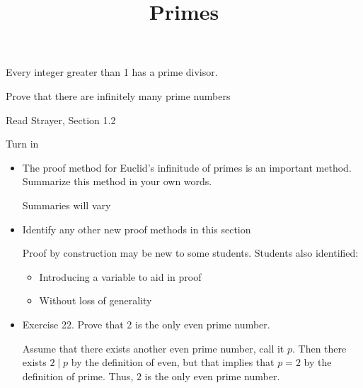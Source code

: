 \documentclass{ximera}
\title{Primes}
\begin{document}
\begin{abstract}
\end{abstract}
\maketitle


\begin{obj}
\item  Every integer greater than 1 has a prime divisor.
\item  Prove that there are infinitely many prime numbers
\end{obj}


\begin{instructorNotes}

\begin{pre}
 \item[Read] Strayer, Section 1.2
 \item[Turn in] 
\begin{itemize}
 \item The proof method for Euclid's infinitude of primes is an important method. Summarize this method in your own words.
 
\begin{solution}
 Summaries will vary
\end{solution}
 \item Identify any other new proof methods in this section
 
\begin{solution}
 Proof by construction may be new to some students. Students also identified: 
\begin{itemize}
 \item Introducing a variable to aid in proof
 \item Without loss of generality
 
\end{itemize}
\end{solution}
 \item Exercise 22. Prove that 2 is the only even prime number.
 
\begin{solution}
 Assume that there exists another even prime number, call it $p$. Then there exists $2\mid p$ by the definition of even, but that implies that $p=2$ by the definition of prime. Thus, $2$ is the only even prime number.
\end{solution}
\end{itemize}
\end{pre}
  
\end{instructorNotes}
\end{document}
